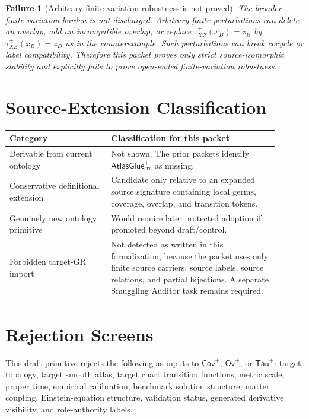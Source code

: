 \documentclass[11pt]{article}
\newcommand{\AtlasGlue}{\mathsf{AtlasGlue}_{\mathrm{src}}^{+}}
\newcommand{\Cov}{\mathsf{Cov}^{+}}
\newcommand{\Ov}{\mathsf{Ov}^{+}}
\newcommand{\Tau}{\mathsf{Tau}^{+}}
\newtheorem{failure}{Failure}
\begin{document}
\begin{failure}[Arbitrary finite-variation robustness is not proved]
The broader finite-variation burden is not discharged. Arbitrary finite
perturbations can delete an overlap, add an incompatible overlap, or replace
\(\tau_{XZ}^+(x_B)=z_B\) by \(\tau_{XZ}^+(x_B)=z_D\) as in the
counterexample. Such perturbations can break cocycle or label compatibility.
Therefore this packet proves only strict source-isomorphic stability and
explicitly fails to prove open-ended finite-variation robustness.
\end{failure}

\section{Source-Extension Classification}

\begin{center}
\begin{tabular}{p{0.34\linewidth}p{0.56\linewidth}}
\hline
Category & Classification for this packet \\
\hline
Derivable from current ontology & Not shown. The prior packets identify
\(\AtlasGlue\) as missing. \\
Conservative definitional extension & Candidate only relative to an expanded
source signature containing local germs, coverage, overlap, and transition
tokens. \\
Genuinely new ontology primitive & Would require later protected adoption if
promoted beyond draft/control. \\
Forbidden target-GR import & Not detected as written in this formalization,
because the packet uses only finite source carriers, source labels, source
relations, and partial bijections. A separate Smuggling Auditor task remains
required. \\
\hline
\end{tabular}
\end{center}

\section{Rejection Screens}

This draft primitive rejects the following as inputs to \(\Cov\), \(\Ov\), or
\(\Tau\): target topology, target smooth atlas, target chart transition
functions, metric scale, proper time, empirical calibration, benchmark
solution structure, matter coupling, Einstein-equation structure, validation
status, generated derivative visibility, and role-authority labels.
\end{document}
